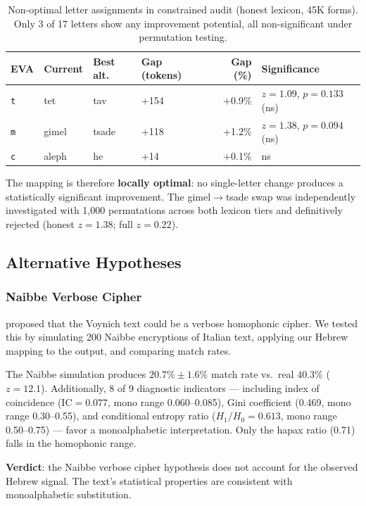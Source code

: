 \documentclass[11pt,a4paper]{article}
\newcommand{\eva}[1]{\texttt{#1}}
\begin{document}
\begin{table}[htbp]
\centering
\caption{Non-optimal letter assignments in constrained audit (honest lexicon,
45K forms). Only 3 of 17 letters show any improvement potential, all
non-significant under permutation testing.}
\label{tab:audit}
\small
\begin{tabular}{@{}llllrl@{}}
\toprule
EVA & Current & Best alt. & Gap (tokens) & Gap (\%) & Significance \\
\midrule
\eva{t} & tet & tav & +154 & +0.9\% & $z=1.09$, $p=0.133$ (ns) \\
\eva{m} & gimel & tsade & +118 & +1.2\% & $z=1.38$, $p=0.094$ (ns) \\
\eva{c} & aleph & he & +14 & +0.1\% & ns \\
\bottomrule
\end{tabular}
\end{table}

The mapping is therefore \textbf{locally optimal}: no single-letter change
produces a statistically significant improvement. The gimel$\to$tsade swap
was independently investigated with 1,000 permutations across both lexicon
tiers and definitively rejected (honest $z=1.38$; full $z=0.22$).


\subsection{Alternative Hypotheses}
\label{sec:alternatives}

\subsubsection{Naibbe Verbose Cipher}
\label{sec:naibbe}

\citet{Greshko2025} proposed that the Voynich text could be a verbose
homophonic cipher. We tested this by simulating 200 Naibbe encryptions of
Italian text, applying our Hebrew mapping to the output, and comparing match
rates.

The Naibbe simulation produces $20.7\% \pm 1.6\%$ match rate vs.\ real
$40.3\%$ ($z=12.1$). Additionally, 8 of 9 diagnostic indicators --- including
index of coincidence (IC$=0.077$, mono range 0.060--0.085), Gini coefficient
(0.469, mono range 0.30--0.55), and conditional entropy ratio ($H_1/H_0=0.613$,
mono range 0.50--0.75) --- favor a monoalphabetic interpretation. Only the
hapax ratio (0.71) falls in the homophonic range.

\textbf{Verdict}: the Naibbe verbose cipher hypothesis does not account for
the observed Hebrew signal. The text's statistical properties are consistent
with monoalphabetic substitution.
\end{document}
